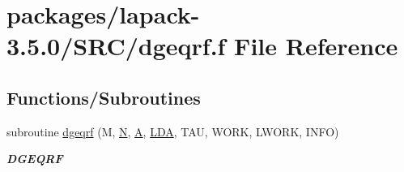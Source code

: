 \hypertarget{dgeqrf_8f}{}\section{packages/lapack-\/3.5.0/\+S\+R\+C/dgeqrf.f File Reference}
\label{dgeqrf_8f}
\subsection*{Functions/\+Subroutines}
\begin{DoxyCompactItemize}
\item 
subroutine \hyperlink{group__doubleGEcomputational_ga3766ea903391b5cf9008132f7440ec7b}{dgeqrf} (M, \hyperlink{polmisc_8c_a0240ac851181b84ac374872dc5434ee4}{N}, \hyperlink{classA}{A}, \hyperlink{example__user_8c_ae946da542ce0db94dced19b2ecefd1aa}{L\+D\+A}, T\+A\+U, W\+O\+R\+K, L\+W\+O\+R\+K, I\+N\+F\+O)
\begin{DoxyCompactList}\small\item\em {\bfseries D\+G\+E\+Q\+R\+F} \end{DoxyCompactList}\end{DoxyCompactItemize}
